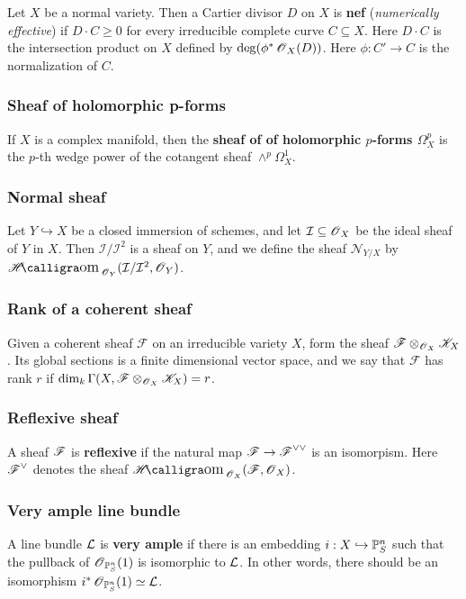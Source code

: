 \documentclass[11pt, english]{article}
\begin{document}
Let $X$ be a normal variety. Then a Cartier divisor $D$ on $X$ is \textbf{nef} (\emph{numerically effective}) if $D \cdot C \geq 0$ for every irreducible complete curve $C \subseteq X$. Here $D \cdot C$ is the intersection product on $X$ defined by $\deg(\phi^\ast \operatorname{\mathscr{O}}_X(D))$. Here $\phi:C' \to C$ is the normalization of $C$. 

\subsubsection{Sheaf of holomorphic p-forms}
\label{pforms}

If $X$ is a complex manifold, then the \textbf{sheaf of of holomorphic $p$-forms $\Omega_X^p$} is the $p$-th wedge power of the cotangent sheaf $\wedge^p \Omega_X^1$. 

\subsubsection{Normal sheaf}
\label{normalsheaf}

Let $Y \hookrightarrow X$ be a closed immersion of schemes, and let $\mathcal I \subseteq \operatorname{\mathscr{O}}_X$ be the ideal sheaf of $Y$ in $X$. Then $\mathcal I/\mathcal I^2$ is a sheaf on $Y$, and we define the sheaf $\mathcal N_{Y/X}$ by $\Shom_{\OO_Y}(\mathcal I/\mathcal I^2, \mathcal \OO_Y)$.

\subsubsection{Rank of a coherent sheaf}
\label{ranksheaf}

Given a coherent sheaf $\mathscr F$ on an irreducible variety $X$, form the sheaf ${\mathscr F \otimes_{\operatorname{\mathscr{O}}_X} \mathscr K_X}$. Its global sections is a finite dimensional vector space, and we say that $\mathscr F$ has rank $r$ if $\dim_k \Gamma(X,\mathscr F \otimes_{\operatorname{\mathscr{O}}_X} \mathscr K_X) = r$.

\subsubsection{Reflexive sheaf}
\label{reflexivesheaf}

A sheaf $\operatorname{\mathscr{F}}$ is \textbf{reflexive} if the natural map $\operatorname{\mathscr{F}} \to \operatorname{\mathscr{F}}^{\vee\vee}$ is an isomorpism. Here $\operatorname{\mathscr{F}}^\vee$ denotes the sheaf $\Shom_{\OO_X}(\FF,\OO_X)$.

\subsubsection{Very ample line bundle}
\label{veryample}
A line bundle $\mathcal{L}$ is \textbf{very ample} if there is an embedding $i:X \hookrightarrow \mathbb{P}_S^n$ such that the pullback of $\operatorname{\mathscr{O}}_{\mathbb{P}_S^n}(1)$ is isomorphic to $\mathcal{L}$. In other words, there should be an isomorphism $i^\ast \operatorname{\mathscr{O}}_{\mathbb{P}^n_S}(1) \simeq \mathcal{L}$.
\end{document}
